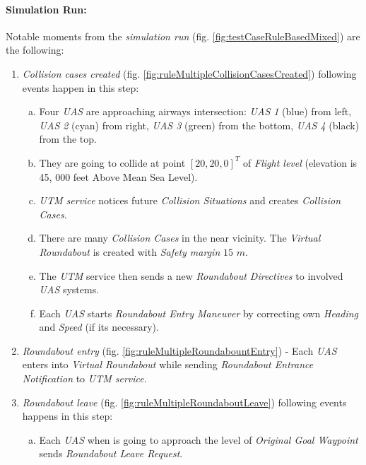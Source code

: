 \paragraph{Simulation Run:} Notable moments from the \emph{simulation run} (fig. \ref{fig:testCaseRuleBasedMixed}) are the following:

\begin{enumerate}
	\item \emph{Collision cases created} (fig. \ref{fig:ruleMultipleCollisionCasesCreated}) following events happen in this step:
	\begin{enumerate}[a.]
		\item Four \emph{UAS} are approaching airways intersection: \emph{UAS 1} (blue) from left, \emph{UAS 2} (cyan) from right, \emph{UAS 3} (green) from the bottom, \emph{UAS 4} (black) from the top.
		
		\item They are going to collide at point $[20,20,0]^T$ of \emph{Flight level} (elevation is 45, 000 feet Above Mean Sea Level).
		
		\item \emph{UTM service} notices future \emph{Collision Situations} and creates \emph{Collision Cases}.
		
		\item There are many \emph{Collision Cases} in the near vicinity. The \emph{Virtual Roundabout} is created with \emph{Safety margin} $15$ $m$.
		
		\item The \emph{UTM} service then sends a new \emph{Roundabout Directives} to involved \emph{UAS} systems.
		
		\item Each \emph{UAS} starts \emph{Roundabout Entry Maneuver} by correcting own  \emph{Heading} and \emph{Speed} (if its necessary).
	\end{enumerate}   
	
	\item \emph{Roundabout entry} (fig. \ref{fig:ruleMultipleRoundabountEntry}) - Each \emph{UAS} enters into \emph{Virtual Roundabout} while sending \emph{Roundabout Entrance Notification} to \emph{UTM service}.
	
	\item \emph{Roundabout leave} (fig. \ref{fig:ruleMultipleRoundaboutLeave})  following events happens in this step:
	\begin{enumerate}[a.]
		\item Each \emph{UAS} when is going to approach the level of \emph{Original Goal Waypoint} sends \emph{Roundabout Leave Request}.
		

\end{enumerate}
\end{enumerate}
